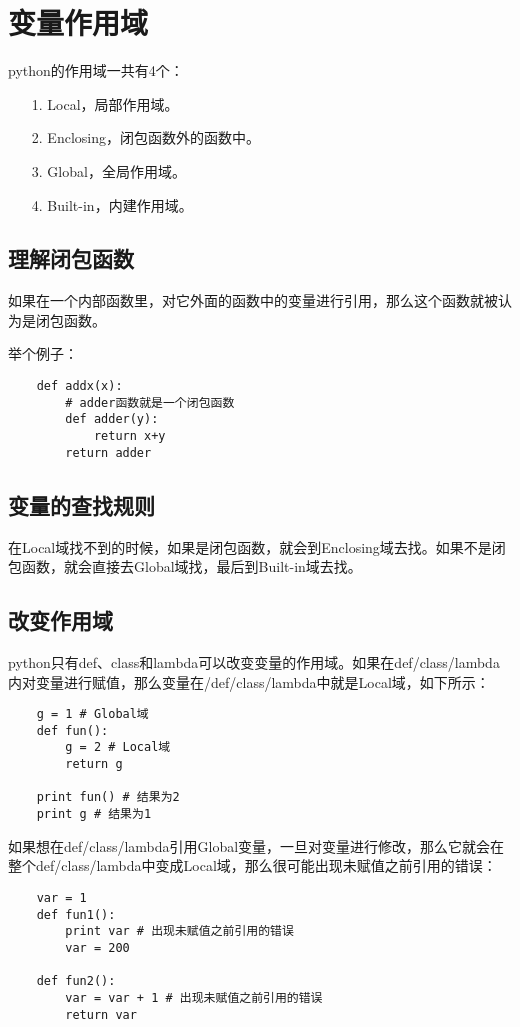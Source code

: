 \documentclass[a4paper,left=2.5cm,right=2.5cm,11pt]{article}
\begin{document}
\tableofcontents

\clearpage

\section{变量作用域}
	python的作用域一共有4个：
	\begin{itemize}
		\item[1.] Local，局部作用域。
		\item[2.] Enclosing，闭包函数外的函数中。
		\item[3.] Global，全局作用域。
		\item[4.] Built-in，内建作用域。
	\end{itemize}

\subsection{理解闭包函数}
	如果在一个内部函数里，对它外面的函数中的变量进行引用，那么这个函数就被认为是闭包函数。\par

	举个例子：
	\begin{lstlisting}
	def addx(x):
		# adder函数就是一个闭包函数
		def adder(y):
			return x+y
		return adder
	\end{lstlisting}

\subsection{变量的查找规则}
	在Local域找不到的时候，如果是闭包函数，就会到Enclosing域去找。如果不是闭包函数，就会直接去Global域找，最后到Built-in域去找。

\subsection{改变作用域}
	python只有def、class和lambda可以改变变量的作用域。如果在def/class/lambda内对变量进行赋值，那么变量在/def/class/lambda中就是Local域，如下所示：
	\begin{lstlisting}
	g = 1 # Global域
	def fun():
		g = 2 # Local域
		return g

	print fun() # 结果为2
	print g # 结果为1
	\end{lstlisting}

	如果想在def/class/lambda引用Global变量，一旦对变量进行修改，那么它就会在整个def/class/lambda中变成Local域，那么很可能出现未赋值之前引用的错误：
	\begin{lstlisting}
	var = 1
	def fun1():
		print var # 出现未赋值之前引用的错误
		var = 200

	def fun2():
		var = var + 1 # 出现未赋值之前引用的错误
		return var
	\end{lstlisting}
\end{document}
